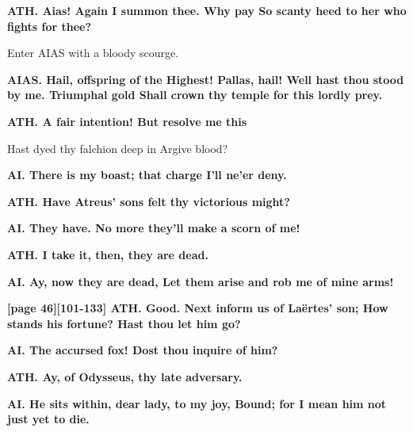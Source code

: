 \documentclass[11pt,letter]{book}
\begin{document}
\par \textbf{ATH. Aias! Again I summon thee. Why pay So scanty heed to her who fights for thee?}
\par 

\par  Enter AIAS with a bloody scourge.

\par \textbf{AIAS. Hail, offspring of the Highest! Pallas, hail! Well hast thou stood by me. Triumphal gold Shall crown thy temple for this lordly prey.}
\par 

\par \textbf{ATH. A fair intention! But resolve me this}
\par   Hast dyed thy falchion deep in Argive blood?

\par \textbf{AI. There is my boast; that charge I’ll ne’er deny.}
\par 

\par \textbf{ATH. Have Atreus’ sons felt thy victorious might?}
\par 

\par \textbf{AI. They have. No more they’ll make a scorn of me!}
\par 

\par \textbf{ATH. I take it, then, they are dead.}
\par 

\par \textbf{AI. Ay, now they are dead, Let them arise and rob me of mine arms!}
\par 

\par \textbf{[page 46][101-133] ATH. Good. Next inform us of Laërtes’ son; How stands his fortune? Hast thou let him go?}
\par 

\par \textbf{AI. The accursed fox! Dost thou inquire of him?}
\par 

\par \textbf{ATH. Ay, of Odysseus, thy late adversary.}
\par 

\par \textbf{AI. He sits within, dear lady, to my joy, Bound; for I mean him not just yet to die.}
\par 
\end{document}
